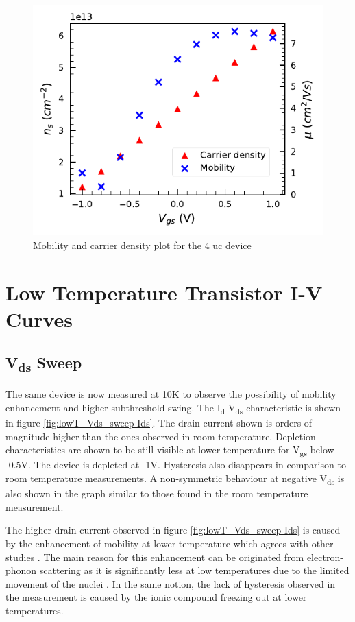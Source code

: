\documentclass[11pt,a4paper]{report}
\begin{document}
\begin{figure}
    \centering
    \includegraphics{Figures/CV/Mobility_and_Carrier_density.pdf}
    \caption{Mobility and carrier density plot for the 4 uc device}
    \label{fig:mobility_carrier}
\end{figure}



\section{Low Temperature Transistor I-V Curves}
\subsection{V\textsubscript{ds} Sweep}
The same device is now measured at 10K to observe the possibility of mobility enhancement and higher subthreshold swing. The I\textsubscript{d}-V\textsubscript{ds} characteristic is shown in figure \ref{fig:lowT_Vds_sweep-Ids}. The drain current shown is orders of magnitude higher than the ones observed in room temperature. Depletion characteristics are shown to be still visible at lower temperature for V\textsubscript{gs} below -0.5V. The device is depleted at -1V. Hysteresis also disappears in comparison to room temperature measurements. A non-symmetric behaviour at negative V\textsubscript{ds} is also shown in the graph similar to those found in the room temperature measurement. 

The higher drain current observed in figure \ref{fig:lowT_Vds_sweep-Ids} is caused by the enhancement of mobility at lower temperature which agrees with other studies \cite{caviglia,bogorin_irvin_cen_levy_2012}. The main reason for this enhancement can be originated from electron-phonon scattering as it is significantly less at low temperatures due to the limited movement of the nuclei \cite{hook_hall_2013}. In the same notion, the lack of hysteresis observed in the measurement is caused by the ionic compound freezing out at lower temperatures.
\end{document}
